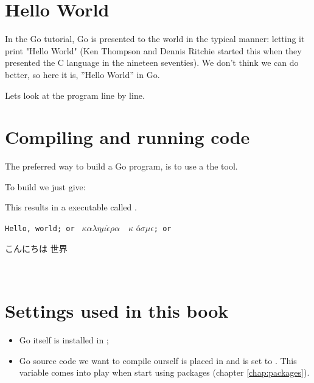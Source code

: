 \section{Hello World}
\label{sec:hello world}
In the Go tutorial, Go is presented to the world in the typical
manner: letting it print "Hello World" (Ken Thompson and
Dennis Ritchie started this when they presented the C language in 
the nineteen seventies). We don't think we can do better, so 
here it is, ''Hello World'' in Go.


Lets look at the program line by line.
\showremarks

\section{Compiling and running code}
\label{sec:building a program}
The preferred way to build a Go program, is to use a
the  tool.

To build  we just give:
\begin{display}
\pr {}
\end{display}
This results in a executable called .

\begin{display}
\pr {}
\end{display}
\vspace{-3.0ex}
\texttt{Hello, world; or }%
\begin{math}\kappa\alpha\lambda\eta\mu\acute{\epsilon}\rho\alpha\hspace{1em}\kappa\end{math}%
\'o\begin{math} \sigma\mu\epsilon\end{math}\texttt{; or }\begin{cjk}こんにちは 世界\end{cjk}
\ \newline
\ \newline

\section{Settings used in this book}
\label{sec:settings used}
\begin{itemize}                            
\item Go itself is installed in  ;                     
\item Go source code we want to compile ourself is placed in  and
 is set to  . This variable comes into play
when start using packages (chapter \ref{chap:packages}).
\end{itemize}

